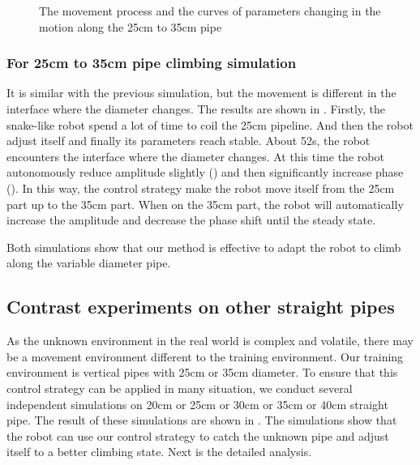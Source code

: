 \begin{figure}[!t]
	\caption{The movement process and the curves of parameters changing in the motion along the 25cm to 35cm pipe}
\end{figure}

\subsubsection{For 25cm to 35cm pipe climbing simulation}
It is similar with the previous simulation, but the movement is different in the interface where the diameter changes. The results are shown in . Firstly, the snake-like robot spend a lot of time to coil the 25cm pipeline. And then the robot adjust itself and finally its parameters reach stable. About 52s, the robot encounters the interface where the diameter changes. At this time the robot autonomously reduce amplitude slightly () and then significantly increase  phase (). In this way, the control strategy make the robot move itself from the 25cm part up to the 35cm part. When on the 35cm part, the robot will automatically increase the amplitude and decrease the phase shift until the steady state.

Both simulations show that our method is effective to adapt the robot to climb along the variable diameter pipe.

\subsection{Contrast experiments on other straight pipes}

As the unknown environment in the real world is complex and volatile, there may be a movement environment different to the training environment. Our training environment is vertical pipes with 25cm or 35cm diameter. To ensure that this control strategy can be applied in many situation, we conduct several  independent simulations on 20cm or 25cm or 30cm or 35cm or 40cm straight pipe. The result of these simulations are shown in . The simulations show that the robot can use our control strategy to catch the unknown pipe and adjust itself to a better climbing state. Next is the detailed analysis.

